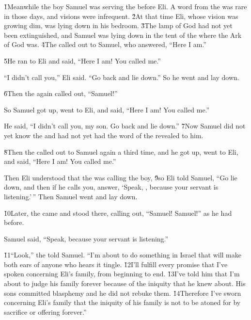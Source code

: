 \v{1}Meanwhile the boy Samuel was serving the  before Eli. A word from the  was rare in those days, and visions were infrequent. \v{2}At that time Eli, whose vision was growing dim, was lying down in his bedroom. \v{3}The lamp of God had not yet been extinguished, and Samuel was lying down in the tent of the  where the Ark of God was. \v{4}The  called out to Samuel, who answered, ``Here I am.''

\v{5}He ran to Eli and said, ``Here I am! You called me.''

``I didn't call you,'' Eli said. ``Go back and lie down.'' So he went and lay down.

\v{6}Then the  again called out, ``Samuel!''

So Samuel got up, went to Eli, and said, ``Here I am! You called me.''

He said, ``I didn't call you, my son. Go back and lie down.'' \v{7}Now Samuel did not yet know the  and had not yet had the word of the  revealed to him.

\v{8}Then the  called out to Samuel again a third time, and he got up, went to Eli, and said, ``Here I am! You called me.''

Then Eli understood that the  was calling the boy, \v{9}so Eli told Samuel, ``Go lie down, and then if he calls you, answer, `Speak, , because your servant is listening.'\,'' Then Samuel went and lay down.

\v{10}Later, the  came and stood there, calling out, ``Samuel! Samuel!'' as he had before.

Samuel said, ``Speak, because your servant is listening.''

\v{11}``Look,'' the  told Samuel. ``I'm about to do something in Israel that will make both ears of anyone who hears it tingle. \v{12}I'll fulfill every promise that I've spoken concerning Eli's family, from beginning to end. \v{13}I've told him that I'm about to judge his family forever because of the iniquity that he knew about. His sons committed blasphemy and he did not rebuke them. \v{14}Therefore I've sworn concerning Eli's family that the iniquity of his family is not to be atoned for by sacrifice or offering forever.''

